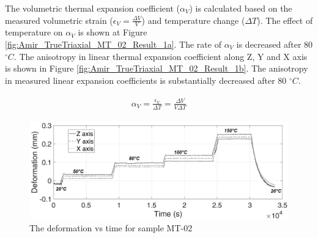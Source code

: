 The volumetric thermal expansion coefficient ($\alpha_V$) is calculated based on the measured volumetric strain ($\epsilon_V=\frac{\Delta V}{V}$) and temperature change ($\Delta T$). The effect of temperature on $\alpha_V$ is shown at Figure \ref{fig:Amir_TrueTriaxial_MT_02_Result_1a}. The rate of $\alpha_V$ is decreased after 80 $^{\circ}C$. The anisotropy in linear thermal expansion coefficient along Z, Y and X axis is shown in Figure \ref{fig:Amir_TrueTriaxial_MT_02_Result_1b}. The anisotropy in measured linear expansion coefficients is substantially decreased after 80 $^{\circ}C$.

\begin{align}
\label{eq:ThermalExpansion}
\begin{split}
\alpha_V=\frac{\epsilon_V}{\Delta T}=\frac{\Delta V}{V\Delta T}
\end{split}
\end{align}

\begin{figure}[!ht]
\centering
\includegraphics[width=1\textwidth]{figures/Amir_TrueTriaxial_MT_02_Result.png}
\caption{The deformation vs time for sample MT-02}
\label{fig:Amir_TrueTriaxial_MT_02_Result}
\end{figure} 

